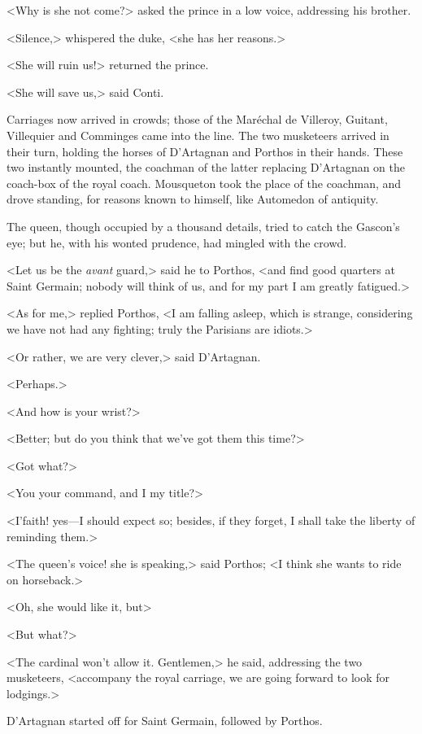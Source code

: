 <Why is she not come?> asked the prince in a low voice, addressing his brother.

<Silence,> whispered the duke, <she has her reasons.>

<She will ruin us!> returned the prince.

<She will save us,> said Conti.

Carriages now arrived in crowds; those of the Maréchal de Villeroy, Guitant, Villequier and Comminges came into the line. The two musketeers arrived in their turn, holding the horses of D'Artagnan and Porthos in their hands. These two instantly mounted, the coachman of the latter replacing D'Artagnan on the coach-box of the royal coach. Mousqueton took the place of the coachman, and drove standing, for reasons known to himself, like Automedon of antiquity.

The queen, though occupied by a thousand details, tried to catch the Gascon's eye; but he, with his wonted prudence, had mingled with the crowd.

<Let us be the \emph{avant} guard,> said he to Porthos, <and find good quarters at Saint Germain; nobody will think of us, and for my part I am greatly fatigued.>

<As for me,> replied Porthos, <I am falling asleep, which is strange, considering we have not had any fighting; truly the Parisians are idiots.>

<Or rather, we are very clever,> said D'Artagnan.

<Perhaps.>

<And how is your wrist?>

<Better; but do you think that we've got them this time?>

<Got what?>

<You your command, and I my title?>

<I'faith! yes—I should expect so; besides, if they forget, I shall take the liberty of reminding them.>

<The queen's voice! she is speaking,> said Porthos; <I think she wants to ride on horseback.>

<Oh, she would like it, but\longdash>

<But what?>

<The cardinal won't allow it. Gentlemen,> he said, addressing the two musketeers, <accompany the royal carriage, we are going forward to look for lodgings.>

D'Artagnan started off for Saint Germain, followed by Porthos.

